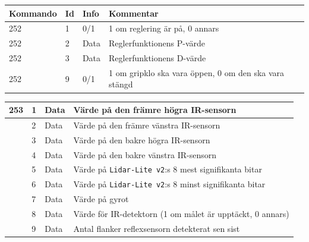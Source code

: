 \documentclass[11pt]{article}
\begin{document}
\begin{flushleft}


\pagebreak

\begin{table}[H]
\begin{tabular}{|p{6em}|p{1em}|p{6em}|p{22em}|} \hline

\textbf{Kommando} & \textbf{Id} & \textbf{Info} & \textbf{Kommentar}\\ \hline

252 & 1 & 0/1 & 1 om reglering är på, 0 annars \\ \hline
252 & 2 & Data & Reglerfunktionens P-värde \\ \hline
252 & 3 & Data & Reglerfunktionens D-värde \\ \hline
252 & 9 & 0/1 & 1 om gripklo ska vara öppen, 0 om den ska vara stängd \\ \hline

\end{tabular}

\begin{tabular}{|p{6em}|p{1em}|p{6em}|p{22em}|} \hline
253\text{*}  & 1 & Data & Värde på den främre högra IR-sensorn \\ \hline
 & 2 & Data & Värde på den främre vänstra IR-sensorn \\ \hline
 & 3 & Data & Värde på den bakre högra IR-sensorn \\ \hline
 & 4 & Data & Värde på den bakre vänstra IR-sensorn \\ \hline
 & 5 & Data &  Värde på \verb+Lidar-Lite v2+:s 8 mest signifikanta bitar \\ \hline
 & 6 & Data &  Värde på \verb+Lidar-Lite v2+:s 8 minst signifikanta bitar \\ \hline
 & 7 & Data & Värde på gyrot \\ \hline
 & 8 & Data & Värde för IR-detektorn (1 om målet är upptäckt, 0 annars) \\ \hline
 & 9 & Data & Antal flanker reflexsensorn detekterat sen sist\\ \hline
\end{tabular}


\end{table}
\end{flushleft}
\end{document}
